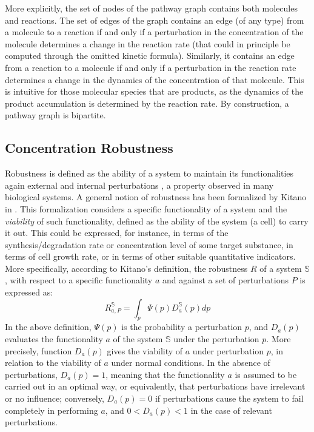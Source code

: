 More explicitly, the set of nodes of the pathway graph contains both molecules and reactions. The set of edges of the graph contains an edge (of any type) from a molecule to a reaction if and only if a perturbation in the concentration of the molecule determines a change in the reaction rate (that could in principle be computed through the omitted kinetic formula). Similarly, it contains an edge from a reaction to a molecule if and only if a perturbation in the reaction rate determines a change in the dynamics of the concentration of that molecule. This is intuitive for those molecular species that are products, as the dynamics of the product accumulation is determined by the reaction rate. By construction, a pathway graph is bipartite.

\subsection{Concentration Robustness}\label{sec:robustness}
Robustness is defined as the ability of a system to maintain its functionalities again external and internal perturbations \citep{kitano2004biological}, a property observed in many biological systems. A general notion of robustness has been formalized by Kitano in \cite{kitano2007towards}. This formalization considers a specific functionality of a system and the \emph{viability} of such functionality, defined as the ability of the system (\eg a cell) to carry it out. This could be expressed, for instance, in terms of the synthesis/degradation rate or concentration level of some target substance, in terms of cell growth rate, or in terms of  other suitable quantitative indicators. More specifically, according to Kitano's definition, the robustness $R$ of a system $\mathbb{S}$, with respect to a specific functionality $a$ and against a set of perturbations $P$ is expressed as:
\[
 R^{\mathbb{S}}_{a,P} = \int_p \Psi(p) D_a^\mathbb{S}(p)dp
\]
In the above definition, $\Psi(p)$ is the probability a perturbation $p$, and $D_a(p)$ evaluates the functionality $a$ of the system $\mathbb{S}$ under the perturbation $p$. More precisely, function $D_a(p)$ gives the viability of $a$ under perturbation $p$, in relation to the viability of $a$ under normal conditions. In the absence of perturbations, $D_a(p)=1$, meaning that the functionality $a$ is assumed to be carried out in an optimal way, or equivalently, that perturbations have irrelevant or no influence; conversely, $D_a(p) = 0$ if perturbations cause the system to fail completely in performing $a$, and $0 < D_a(p) < 1$ in the case of relevant perturbations.

